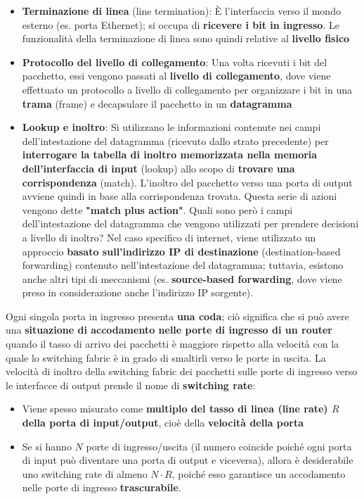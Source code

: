 \documentclass[12pt]{article}
\begin{document}
\begin{itemize}
    \item \textbf{Terminazione di linea} (line termination): È l'interfaccia verso il mondo esterno (es. porta Ethernet); si occupa di \textbf{ricevere i bit in ingresso}. Le funzionalità della terminazione di linea sono quindi
    relative al \textbf{livello fisico}
    \item \textbf{Protocollo del livello di collegamento}: Una volta ricevuti i bit del pacchetto, essi vengono passati al \textbf{livello di collegamento}, dove viene effettuato un protocollo a livello di collegamento per organizzare i bit in una \textbf{trama} (frame) e decapsulare il pacchetto in un \textbf{datagramma}
    \item \textbf{Lookup e inoltro}: Si utilizzano le informazioni contenute nei campi dell'intestazione del datagramma (ricevuto dallo strato precedente) per \textbf{interrogare la tabella di inoltro memorizzata nella memoria dell'interfaccia di input} (lookup) allo scopo di \textbf{trovare una corrispondenza} (match). 
    L'inoltro del pacchetto verso una porta di output avviene quindi in base alla corrispondenza trovata. Questa serie di azioni vengono dette \textbf{"match plus action"}.
    Quali sono però i campi dell'intestazione del datagramma che vengono utilizzati per prendere decisioni a livello di inoltro?
    Nel caso specifico di internet, viene utilizzato un approccio \textbf{basato sull'indirizzo IP di destinazione} (destination-based forwarding) contenuto nell'intestazione del datagramma;
    tuttavia, esistono anche altri tipi di meccanismi (es. \textbf{source-based forwarding}, dove viene preso in considerazione anche l'indirizzo IP sorgente).
\end{itemize}
Ogni singola porta in ingresso presenta \textbf{una coda}; ciò significa che si può avere una \textbf{situazione di accodamento nelle porte di ingresso di un router} quando il tasso di arrivo dei pacchetti è maggiore rispetto alla velocità con la quale lo switching fabric è in grado di smaltirli verso le porte in uscita.
La velocità di inoltro della switching fabric dei pacchetti sulle porte di ingresso verso le interfacce di output prende il nome di \textbf{switching rate}:
\begin{itemize}
    \item Viene spesso misurato come \textbf{multiplo del tasso di linea (line rate) $R$ della porta di input/output}, cioè della \textbf{velocità della porta}
    \item Se si hanno $N$ porte di ingresso/uscita (il numero coincide poiché ogni porta di input può diventare una porta di output e viceversa), allora è desiderabile uno switching rate di almeno $N \cdot R$, poiché esso garantisce un accodamento nelle porte di ingresso \textbf{trascurabile}.
\end{itemize}
\end{document}
